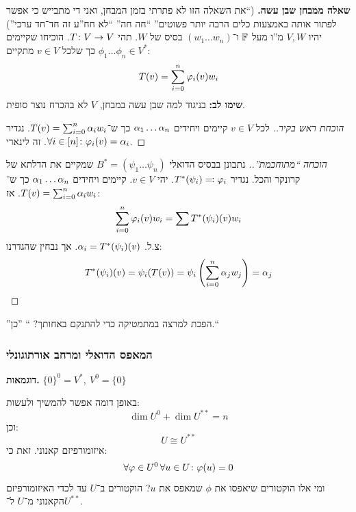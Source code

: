 \documentclass[name=רשימות אלגברה לינארית 2א]{../../../tex/classes/megasumPreamble}
\begin{document}
	\textbf{שאלה ממבחן שבן עשה. }(``את השאלה הזו לא פתרתי בזמן המבחן, ואני די מתבייש כי אפשר לפתור אותה באמצעות כלים הרבה יותר פשוטים'' ``חה חה'' ``לא חח''ע זה חד־חד ערכי'') יהיו $V, W$ מ''ו מעל $\mathbb{F}$ ו־$(w_1 \dots w_n)$ בסיס של $W$. תהי $T \colon V \to V$. הוכיחו שקיימים $\phi_1 \dots \phi_n \in V^*$ כך שלכל $v \in V$ מתקיים: 
	\[ T(v) = \sum_{i = 0}^{n} \varphi_i(v) w_i \]
	\textbf{שימו לב: }בניגוד למה שבן עשה במבחן, $V$ לא בהכרח נוצר סופית. 
	\begin{proof}[הוכחת ראש בקיר.]
		לכל $v \in V$ קיימים ויחידים $\alpha_1 \dots \alpha_n$ כך ש־$T(v) = \sum_{i = 0}^{n} \alpha_i w_i$. נגדיר $\forall i \in [n] \colon \varphi_i(v) = \alpha_i$. זה לינארי. 
	\end{proof}
	
	\begin{proof}[הוכחה ``מתוחכמת''.]
		נתבונן בבסיס הדואלי $B^* = (\psi_1 \dots \psi_n)$ שמקיים את הדלתא של קרונקר והכל. 
		נגדיר $T^*(\psi_i) \eqqcolon \varphi_i$. יהי $v \in V$. קיימים ויחידים $\alpha_1 \dots \alpha_n$ כך ש־$T(v) = \sum_{i = 0}^{n} \alpha_i w_i$. אז: 
		\[ \sum_{i = 0}^{n} \varphi_i(v)w_i = \sum T^*(\psi_i)(v) w_i \]
		צ.ל. $\alpha_i = T^*(\psi_i)(v)$. אך נבחין שהגדרנו: 
		\[ T^*(\psi_i)(v) = \psi_i(T(v)) = \psi_i\left ( \sum_{i = 0}^{n} \alpha_j w_j \right ) = \alpha_j \]
		
	\end{proof}
	
	''הפכת למרצה במתמטיקה כדי להתנקם באחותך? \!`` ''כן.``
	
	\subsubsection{המאפס הדואלי ומרחב אורתוגונלי}
	
	\textbf{דוגמאות. } \hfil $\{0\}^0 = V^*, \ V^0 = \{0\}$
	
	
	באופן דומה אפשר להמשיך ולעשות: 
	\[ \dim U^0 + \dim U^{**} = n \]
	וכן: 
	\[ U \cong U^{**} \]
	איזומורפיזם קאנוני. זאת כי:
	\[ \forall \varphi \in U^0 \, \forall u \in U \colon \varphi(u) = 0 \]
	ומי אלו הוקטורים שיאפסו את $\phi$ שמאפס את $u$? הוקטורים ב־$U$ עד לכדי האיזומורפיזם הקאנוני מ־$U$ ל־$U^{**}$. 
	
\end{document}
